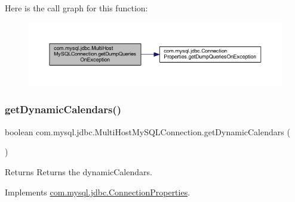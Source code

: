 Here is the call graph for this function\+:
\nopagebreak
\begin{figure}[H]
\begin{center}
\leavevmode
\includegraphics[width=350pt]{classcom_1_1mysql_1_1jdbc_1_1_multi_host_my_s_q_l_connection_a88ceed8bf1e9e9b2b9d4e524eebb727f_cgraph}
\end{center}
\end{figure}
\mbox{\label{classcom_1_1mysql_1_1jdbc_1_1_multi_host_my_s_q_l_connection_a680a95f48f0e52a86bcf911f209afaa3}} 
\subsubsection{\texorpdfstring{get\+Dynamic\+Calendars()}{getDynamicCalendars()}}
{\footnotesize\ttfamily boolean com.\+mysql.\+jdbc.\+Multi\+Host\+My\+S\+Q\+L\+Connection.\+get\+Dynamic\+Calendars (\begin{DoxyParamCaption}{ }\end{DoxyParamCaption})}

\begin{DoxyReturn}{Returns}
Returns the dynamic\+Calendars. 
\end{DoxyReturn}


Implements \mbox{\hyperlink{interfacecom_1_1mysql_1_1jdbc_1_1_connection_properties_aa8a465589df5cfff61d5903b1cb6fb85}{com.\+mysql.\+jdbc.\+Connection\+Properties}}.

